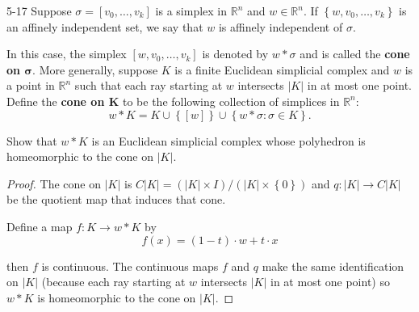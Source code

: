 \begin{problem}{5-17}\label{problem:5-17}
Suppose \( \sigma = [v_{0}, \ldots, v_{k}] \) is a simplex in \( \mathbb{R}^{n} \) and \( w \in \mathbb{R}^{n} \). If \( \left\{ w, v_{0}, \ldots, v_{k} \right\} \) is an affinely independent set, we say that \( w \) is affinely independent of \( \sigma \).

In this case, the simplex \( [w, v_{0}, \ldots, v_{k}] \) is denoted by \( w \ast \sigma \) and is called the \textbf{cone on \( \mathbf{\sigma} \)}. More generally, suppose \( K \) is a finite Euclidean simplicial complex and \( w \) is a point in \( \mathbb{R}^{n} \) such that each ray starting at \( w \) intersects \( \left\vert K \right\vert \) in at most one point. Define the \textbf{cone on \( \mathbf{K} \)} to be the following collection of simplices in \( \mathbb{R}^{n} \):
\[
	w \ast K = K \cup \left\{ [w] \right\} \cup \left\{ w \ast \sigma : \sigma \in K \right\}.
\]

Show that \( w\ast K \) is an Euclidean simplicial complex whose polyhedron is homeomorphic to the cone on \( \left\vert K \right\vert \).
\end{problem}

\begin{proof}
	The cone on \( \left\vert K \right\vert \) is \( C\left\vert K \right\vert = (\left\vert K \right\vert \times I)/(\left\vert K \right\vert \times\left\{0\right\}) \) and \( q: \left\vert K \right\vert \to C\left\vert K \right\vert \) be the quotient map that induces that cone.

	Define a map \( f: K \to w\ast K \) by
	\[
		f(x) = (1 - t)\cdot w + t\cdot x
	\]

	then \( f \) is continuous. The continuous maps \( f \) and \( q \) make the same identification on \( \left\vert K \right\vert \) (because each ray starting at \( w \) intersects \( \left\vert K \right\vert \) in at most one point) so \( w\ast K \) is homeomorphic to the cone on \( \left\vert K \right\vert \).
\end{proof}

